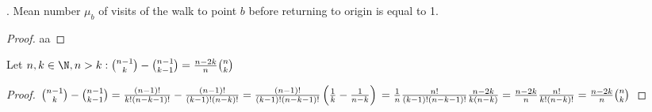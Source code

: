 \begin{thm}\label{thm-mean_number_visits}
 \Lrws. Mean number $\mu_b$ of visits of the walk to point $b$ before returning to origin is equal to 1.
\end{thm}
\begin{proof}
 aa
\end{proof}

\begin{lemma}\label{lemma-binom_identity}
 Let $n,k \in \N, n>k:\binom{n-1}{k}-\binom{n-1}{k-1}=\frac{n-2k}{n}\binom{n}{k}$
\end{lemma}
\begin{proof}
 $\binom{n-1}{k}-\binom{n-1}{k-1}
 =\frac{ \left( n-1 \right) !}{k! \left( n-k-1 \right) !}-\frac{ \left( n-1 \right) !}{ \left( k-1 \right) ! \left( n-k \right) !}
 =\frac{ \left( n-1 \right) !}{ \left( k-1 \right) ! \left( n-k-1 \right) !} \left( \frac{1}{k}-\frac{1}{n-k} \right)\\
 =\frac{1}{n}\frac{n!}{ \left( k-1 \right) ! \left( n-k-1 \right) !}\frac{n-2k}{k \left( n-k \right) }
 =\frac{n-2k}{n}\frac{n!}{k! \left( n-k \right) !}=\frac{n-2k}{n}\binom{n}{k}$
\end{proof}

